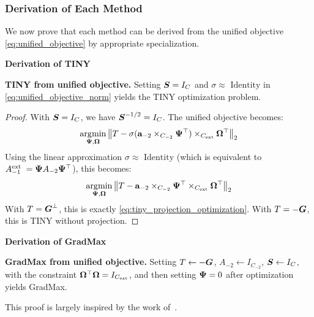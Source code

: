 \subsubsection{Derivation of Each Method}

We now prove that each method can be derived from the unified objective
\autoref{eq:unified_objective} by appropriate specialization.

\noindent\textbf{Derivation of TINY}

\begin{proposition}\label{prop:tiny_derivation}

\textbf{TINY from unified objective.} Setting \(\boldsymbol{S} = I_{C}\) and
\(\sigma \approx \text{ Identity}\) in \autoref{eq:unified_objective_norm}
yields the TINY optimization problem.

\end{proposition}

\begin{proof}

With \(\boldsymbol{S} = I_{C}\), we have \(\boldsymbol{S}^{-1/2} = I_{C}\). The unified
objective becomes:
\[\operatorname*{\arg\!\min}_{\boldsymbol{\Psi}{},\boldsymbol{\Omega}{}}\left\| {T - \sigma(\mathbf{a}_{- 2} \times_{C_{- 2}}\boldsymbol{\Psi}{}^{\top}) \times_{C_{\text{ext}}}\boldsymbol{\Omega}{}^{\top}} \right\|_{2}\]
Using the linear approximation \(\sigma \approx \text{ Identity}\)
(which is equivalent to
\(A_{- 1}^{\text{ext }} = \boldsymbol{\Psi}{}A_{- 2}\boldsymbol{\Psi}{}^{\top}\)), this
becomes:
\[\operatorname*{\arg\!\min}_{\boldsymbol{\Psi}{},\boldsymbol{\Omega}{}}\left\| {T - \mathbf{a}_{- 2} \times_{C_{- 2}}\boldsymbol{\Psi}{}^{\top} \times_{C_{\text{ext}}}\boldsymbol{\Omega}{}^{\top}} \right\|_{2}\]
With \(T = {\boldsymbol{G}^\perp}\), this is exactly
\autoref{eq:tiny_projection_optimization}. With \(T = - \boldsymbol{G}\), this
is TINY without projection.

\end{proof}

\noindent\textbf{Derivation of GradMax}

\begin{proposition}\label{prop:gradmax_derivation}

\textbf{GradMax from unified objective.} Setting
\(T \leftarrow - \boldsymbol{G}\), \(A_{- 2} \leftarrow I_{C_{- 2}}\),
\(\boldsymbol{S} \leftarrow I_{C}\), with the constraint
\(\boldsymbol{\Omega}{}^{\top}\boldsymbol{\Omega}{} = I_{C_{\text{ext}}}\), and then setting
\(\boldsymbol{\Psi}{} = 0\) after optimization yields GradMax.
\end{proposition}
This proof is largely inspired by the work of~\citep{verbockhaven_growing_2024}.

